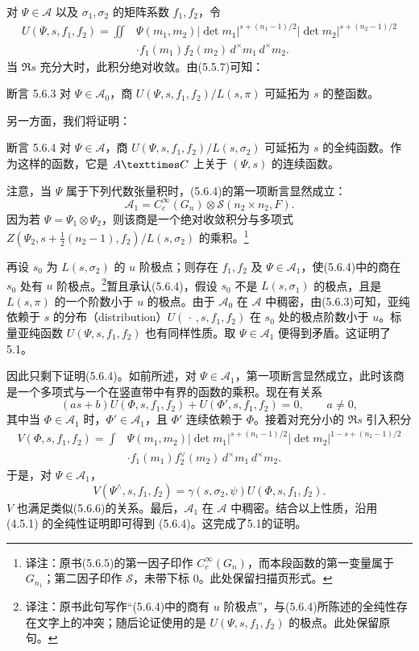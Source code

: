 对 $\Psi\in\mathcal A$ 以及 $\sigma_1,\sigma_2$ 的矩阵系数 $f_1,f_2$，令
\[
\begin{split}
 U(\Psi,s,f_1,f_2)=\iint{}&\Psi(m_1,m_2)|\det m_1|^{s+(n_1-1)/2}
 |\det m_2|^{s+(n_2-1)/2}\\
 &\cdot f_1(m_1)f_2(m_2)\,d^\times m_1\,d^\times m_2.
\end{split}\tag{5.6.2}
\]
当 $\Re s$ 充分大时，此积分绝对收敛。由(5.5.7)可知：
\begin{originaltheorem}{断言 5.6.3}
对 $\Psi\in\mathcal A_0$，商 $U(\Psi,s,f_1,f_2)/L(s,\pi)$ 可延拓为 $s$ 的整函数。
\end{originaltheorem}
另一方面，我们将证明：
\begin{originaltheorem}{断言 5.6.4}
对 $\Psi\in\mathcal A$，商 $U(\Psi,s,f_1,f_2)/L(s,\sigma_2)$ 可延拓为 $s$ 的全纯函数。作为这样的函数，它是 $\mathcal A\times\C$ 上关于 $(\Psi,s)$ 的连续函数。
\end{originaltheorem}
注意，当 $\Psi$ 属于下列代数张量积时，(5.6.4)的第一项断言显然成立：
\[
 \mathcal A_1=C_c^\infty(G_n)\otimes\mathcal S(n_2\times n_2,F).\tag{5.6.5}
\]
因为若 $\Psi=\Psi_1\otimes\Psi_2$，则该商是一个绝对收敛积分与多项式 $Z(\Psi_2,s+\tfrac12(n_2-1),f_2)/L(s,\sigma_2)$ 的乘积。\footnote{译注：原书(5.6.5)的第一因子印作 $C_c^\infty(G_n)$，而本段函数的第一变量属于 $G_{n_1}$；第二因子印作 $\mathcal S$，未带下标 $0$。此处保留扫描页形式。}

再设 $s_0$ 为 $L(s,\sigma_2)$ 的 $u$ 阶极点；则存在 $f_1,f_2$ 及 $\Psi\in\mathcal A_1$，使(5.6.4)中的商在 $s_0$ 处有 $u$ 阶极点。\footnote{译注：原书此句写作“(5.6.4)中的商有 $u$ 阶极点”，与(5.6.4)所陈述的全纯性存在文字上的冲突；随后论证使用的是 $U(\Psi,s,f_1,f_2)$ 的极点。此处保留原句。}暂且承认(5.6.4)，假设 $s_0$ 不是 $L(s,\sigma_1)$ 的极点，且是 $L(s,\pi)$ 的一个阶数小于 $u$ 的极点。由于 $\mathcal A_0$ 在 $\mathcal A$ 中稠密，由(5.6.3)可知，亚纯依赖于 $s$ 的分布（distribution）$U(\,\cdot\,,s,f_1,f_2)$ 在 $s_0$ 处的极点阶数小于 $u$。标量亚纯函数 $U(\Psi,s,f_1,f_2)$ 也有同样性质。取 $\Psi\in\mathcal A_1$ 便得到矛盾。这证明了5.1。

因此只剩下证明(5.6.4)。如前所述，对 $\Psi\in\mathcal A_1$，第一项断言显然成立，此时该商是一个多项式与一个在竖直带中有界的函数的乘积。现在有关系
\[
 (as+b)U(\Phi,s,f_1,f_2)+U(\Phi',s,f_1,f_2)=0,\qquad a\ne0,\tag{5.6.6}
\]
其中当 $\Phi\in\mathcal A_1$ 时，$\Phi'\in\mathcal A_1$，且 $\Phi'$ 连续依赖于 $\Phi$。接着对充分小的 $\Re s$ 引入积分
\[
\begin{split}
 V(\Phi,s,f_1,f_2)=\int{}&\Psi(m_1,m_2)|\det m_1|^{s+(n_1-1)/2}
 |\det m_2|^{1-s+(n_2-1)/2}\\
 &\cdot f_1(m_1)f_2^\vee(m_2)\,d^\times m_1\,d^\times m_2.
\end{split}
\]
于是，对 $\Psi\in\mathcal A_1$，
\[
 V(\Psi^\wedge,s,f_1,f_2)=\gamma(s,\sigma_2,\psi)U(\Phi,s,f_1,f_2).
\]
$V$ 也满足类似(5.6.6)的关系。最后，$\mathcal A_1$ 在 $\mathcal A$ 中稠密。结合以上性质，沿用 (4.5.1) 的全纯性证明即可得到 (5.6.4)。这完成了5.1的证明。

